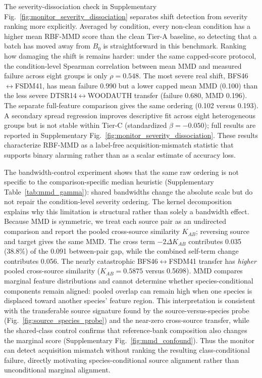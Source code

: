 \documentclass[a4paper,fleqn]{els-cas-templates/cas-sc}
\begin{document}
The severity-dissociation check in Supplementary
Fig.~\ref{fig:monitor_severity_dissociation}
separates shift detection from severity ranking more explicitly. Averaged by
condition, every non-clean condition has a higher mean RBF-MMD score than the
clean Tier-A baseline, so detecting that a batch has moved away from $B_0$ is
straightforward in this benchmark. Ranking how damaging the shift is remains
harder: under the same capped-score protocol, the condition-level Spearman
correlation between mean MMD and measured failure across eight groups is only
$\rho=0.548$. The most severe real shift,
BFS46$\leftrightarrow$FSDM41, has mean failure 0.990 but a lower capped mean MMD
(0.100) than the less severe DTSR14$\leftrightarrow$WOODAUTH transfer
(failure 0.680, MMD 0.196). The separate full-feature comparison gives the same
ordering (0.102 versus 0.193). A secondary spread regression improves descriptive
fit across eight heterogeneous groups but is not stable within Tier-C
(standardized $\beta=-0.050$); full results are reported in Supplementary
Fig.~\ref{fig:monitor_severity_dissociation}. These results characterize
RBF-MMD as a label-free acquisition-mismatch statistic that supports binary
alarming rather than as a scalar estimate of accuracy loss.

The bandwidth-control experiment shows that the same raw ordering is not
specific to the comparison-specific median heuristic
(Supplementary Table~\ref{tab:mmd_gamma}): shared bandwidths change the
absolute scale but do not repair the condition-level severity ordering. The
kernel decomposition explains why this
limitation is structural rather than solely a bandwidth effect. Because MMD is
symmetric, we treat each source pair as an undirected comparison and report the
pooled cross-source similarity $K_{AB}$; reversing source and target gives the
same MMD. The cross term $-2\Delta K_{AB}$ contributes 0.035 (38.8\%) of the
0.091 between-pair gap,
while the combined self-term change contributes 0.056. The nearly catastrophic
BFS46$\leftrightarrow$FSDM41 transfer has \emph{higher} pooled cross-source
similarity ($K_{AB}=0.5875$ versus 0.5698). MMD compares marginal feature
distributions and cannot determine whether species-conditional components
remain aligned: pooled overlap can remain high when one species is displaced
toward another species' feature region. This interpretation is consistent with
the transferable source signature found by the source-versus-species probe
(Fig.~\ref{fig:source_species_probe}) and the near-zero cross-source transfer, while
the shared-class control confirms that reference-bank composition also changes
the marginal score (Supplementary Fig.~\ref{fig:mmd_confound}). Thus the
monitor can detect acquisition mismatch without ranking the resulting
class-conditional failure, directly motivating species-conditional source
alignment rather than unconditional marginal alignment.
\end{document}
